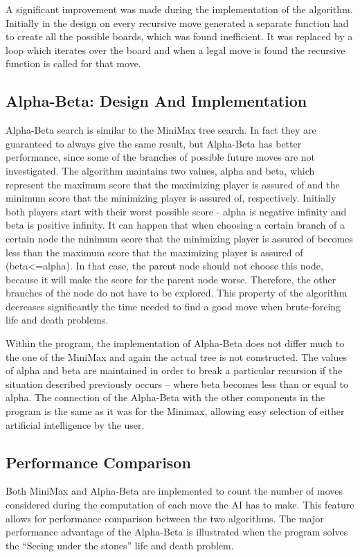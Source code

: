 \documentclass{l3proj}
\begin{document}
A significant improvement was made during the implementation of the algorithm. Initially in the design on every recursive move generated a separate function had to create all the possible boards, which was found inefficient. It was replaced by a loop which iterates over the board and when a legal move is found the recursive function is called for that move.

\subsection{Alpha-Beta: Design And Implementation}

Alpha-Beta search is similar to the MiniMax tree search. In fact they are guaranteed to always give the same result, but Alpha-Beta has better performance, since some of the branches of possible future moves are not investigated. The algorithm maintains two values, alpha and beta, which represent the maximum score that the maximizing player is assured of and the minimum score that the minimizing player is assured of, respectively. Initially both players start with their worst possible score - alpha is negative infinity and beta is positive infinity. It can happen that when choosing a certain branch of a certain node the minimum score that the minimizing player is assured of becomes less than the maximum score that the maximizing player is assured of (beta<=alpha). In that case, the parent node should not choose this node, because it will make the score for the parent node worse. Therefore, the other branches of the node do not have to be explored. This property of the algorithm decreases significantly the time needed to find a good move when brute-forcing life and death problems.

Within the program, the implementation of Alpha-Beta does not differ much to the one of the MiniMax and again the actual tree is not constructed. The values of alpha and beta are maintained in order to break a particular recursion if the situation described previously occurs – where beta becomes less than or equal to alpha. The connection of the Alpha-Beta with the other components in the program is the same as it was for the Minimax, allowing easy selection of either artificial intelligence by the user.

\subsection{Performance Comparison}

Both MiniMax and Alpha-Beta are implemented to count the number of moves considered during the computation of each move the AI has to make. This feature allows for performance comparison between the two algorithms. The major performance advantage of the Alpha-Beta is illustrated when the program solves the “Seeing under the stones” life and death problem.
\end{document}
